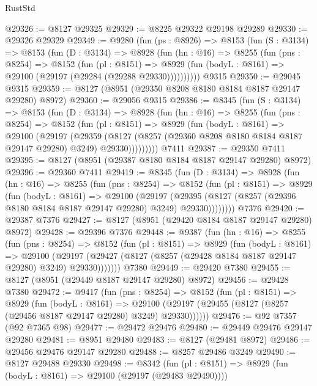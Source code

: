 \begin{lexlean}{RustStd}
\begin{coremodule}
@29326 := @8127 @29325
@29329 := @8225 @29322 @29198 @29289
@29330 := @29326 @29329
@29349 := @9280
    (fun (ps : @8926) =>
    @8153
      (fun (S : @3134) =>
      @8153
        (fun (D : @3134) =>
        @8928
          (fun (hn : @16) =>
          @8255
            (fun (pns : @8254) =>
            @8152
              (fun (pl : @8151) =>
              @8929 (fun (bodyL : @8161) => @29100 (@29197 (@29284 (@29288 @29330))))))))))
    @9315
@29350 := @29045 @9315
@29359 := @8127 (@8951 (@29350 @8208 @8180 @8184 @8187 @29147 @29280) @8972)
@29360 := @29056 @9315
@29386 := @8345
    (fun (S : @3134) =>
    @8153
      (fun (D : @3134) =>
      @8928
        (fun (hn : @16) =>
        @8255
          (fun (pns : @8254) =>
          @8152
            (fun (pl : @8151) =>
            @8929
              (fun (bodyL : @8161) =>
              @29100
                (@29197
                  (@29359
                    (@8127
                      (@8257 (@29360 @8208 @8180 @8184 @8187 @29147 @29280) @3249)
                      @29330)))))))))
    @7411
@29387 := @29350 @7411
@29395 := @8127 (@8951 (@29387 @8180 @8184 @8187 @29147 @29280) @8972)
@29396 := @29360 @7411
@29419 := @8345
    (fun (D : @3134) =>
    @8928
      (fun (hn : @16) =>
      @8255
        (fun (pns : @8254) =>
        @8152
          (fun (pl : @8151) =>
          @8929
            (fun (bodyL : @8161) =>
            @29100
              (@29197
                (@29395 (@8127 (@8257 (@29396 @8180 @8184 @8187 @29147 @29280) @3249) @29330))))))))
    @7376
@29420 := @29387 @7376
@29427 := @8127 (@8951 (@29420 @8184 @8187 @29147 @29280) @8972)
@29428 := @29396 @7376
@29448 := @9387
    (fun (hn : @16) =>
    @8255
      (fun (pns : @8254) =>
      @8152
        (fun (pl : @8151) =>
        @8929
          (fun (bodyL : @8161) =>
          @29100
            (@29197 (@29427 (@8127 (@8257 (@29428 @8184 @8187 @29147 @29280) @3249) @29330)))))))
    @7380
@29449 := @29420 @7380
@29455 := @8127 (@8951 (@29449 @8187 @29147 @29280) @8972)
@29456 := @29428 @7380
@29472 := @9417
    (fun (pns : @8254) =>
    @8152
      (fun (pl : @8151) =>
      @8929
        (fun (bodyL : @8161) =>
        @29100 (@29197 (@29455 (@8127 (@8257 (@29456 @8187 @29147 @29280) @3249) @29330))))))
@29476 := @92 @7357 (@92 @7365 @98)
@29477 := @29472 @29476
@29480 := @29449 @29476 @29147 @29280
@29481 := @8951 @29480
@29483 := @8127 (@29481 @8972)
@29486 := @29456 @29476 @29147 @29280
@29488 := @8257 @29486 @3249
@29490 := @8127 @29488 @29330
@29498 := @8342
    (fun (pl : @8151) => @8929 (fun (bodyL : @8161) => @29100 (@29197 (@29483 @29490))))

\end{coremodule}
\end{lexlean}
